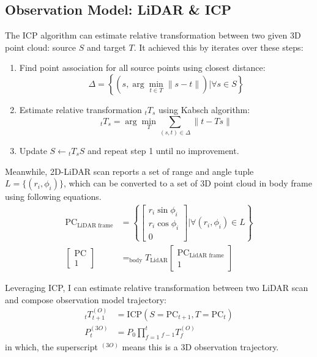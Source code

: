 \documentclass[conference]{IEEEtran}
\begin{document}
\subsection{Observation Model: LiDAR \& ICP}
The ICP algorithm can estimate relative transformation between 
two given 3D point cloud: source $S$ and target $T$.
It achieved this by iterates over these steps:
\begin{enumerate}
    \item Find point association for all source points using closest distance:
    $$ \Delta = \left\{\left(s, \arg\min_{t\in T} \|s - t\| \right) | \forall s\in S\right\}$$

    \item Estimate relative transformation $_tT_s$ using Kabsch algorithm:
    $$_tT_s = \arg\min_T \sum\limits_{(s,t)\in\Delta} \|t - Ts\|$$

    \item Update $S \leftarrow {}_tT_s S$ and repeat step 1 until no improvement.
\end{enumerate}

Meanwhile, 2D-LiDAR scan reports a set of range and angle tuple $L = \{(r_i, \phi_i)\}$,
which can be converted to a set of 3D point cloud in body frame using following equations.
$$
\begin{aligned}
    \mathrm{PC}_{\text{LiDAR frame}} 
        &= \left\{ \left[ \begin{gathered}r_i\sin \phi_i \\ r_i\cos \phi_i \\ 0\end{gathered} \right] | \forall (r_i, \phi_i)\in L\right\} 
        \\
    \left[ \begin{gathered} \mathrm{PC} \\ 1\end{gathered} \right]  
    &= _{\text{body}}T_{\text{LidAR}}  \left[ \begin{gathered} \mathrm{PC}_{\text{LidAR frame}}  \\ 1\end{gathered} \right]  
\end{aligned}
$$

Leveraging ICP, I can estimate relative transformation between two LiDAR scan and
compose observation model trajectory:
$$
\begin{aligned}
    _{t}T^{(O)}_{t+1}
        &=\text{ICP}(S=\mathrm{PC}_{t+1}, T=\mathrm{PC}_{t}) \\ 
    P^{(3O)}_{t}
        &=P_{0}\prod^{t}_{f=1} {}_{f-1} T^{(O)}_{f}
\end{aligned} 
$$
in which, the superscript $^{(3O)}$ means this is a 3D observation trajectory.
\end{document}
